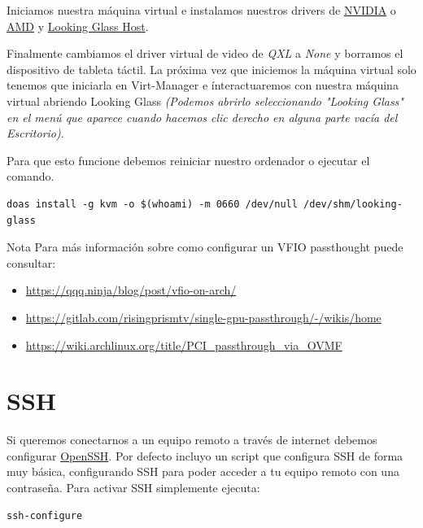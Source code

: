 \documentclass[12pt]{article}
\begin{document}
Iniciamos nuestra máquina virtual e instalamos nuestros drivers de \href{https://www.nvidia.es/Download/index.aspx?lang=es}{NVIDIA} o \href{https://www.amd.com/es/support}{AMD} y \href{https://looking-glass.io/downloads}{Looking Glass Host}.

Finalmente cambiamos el driver virtual de video de \emph{QXL} a \emph{None} y borramos el dispositivo de tableta táctil. La próxima vez que iniciemos la máquina virtual solo tenemos que iniciarla en Virt-Manager e ínteractuaremos con nuestra máquina virtual abriendo Looking Glass \emph{(Podemos abrirlo seleccionando "Looking Glass" en el menú que aparece cuando hacemos clic derecho en alguna parte vacía del Escritorio)}.

Para que esto funcione debemos reiniciar nuestro ordenador o ejecutar el comando.

\begin{verbatim}
doas install -g kvm -o $(whoami) -m 0660 /dev/null /dev/shm/looking-glass
\end{verbatim}

\begin{mybox}{Nota}
	Para más información sobre como configurar un VFIO passthought puede consultar:
	\begin{itemize}
		\setlength\itemsep{0em}
		\item \href{https://qqq.ninja/blog/post/vfio-on-arch/}{https://qqq.ninja/blog/post/vfio-on-arch/}
		\item \href{https://gitlab.com/risingprismtv/single-gpu-passthrough/-/wikis/home}{https://gitlab.com/risingprismtv/single-gpu-passthrough/-/wikis/home}
		\item \href{https://wiki.archlinux.org/title/PCI\_passthrough\_via\_OVMF}{https://wiki.archlinux.org/title/PCI\_passthrough\_via\_OVMF}
	\end{itemize}
\end{mybox}

\section{SSH}

Si queremos conectarnos a un equipo remoto a través de internet debemos configurar \href{https://es.wikipedia.org/wiki/OpenSSH}{OpenSSH}. Por defecto incluyo un script que configura SSH de forma muy básica, configurando SSH para poder acceder a tu equipo remoto con una contraseña. Para activar SSH simplemente ejecuta:

\begin{verbatim}
ssh-configure
\end{verbatim}
\end{document}
